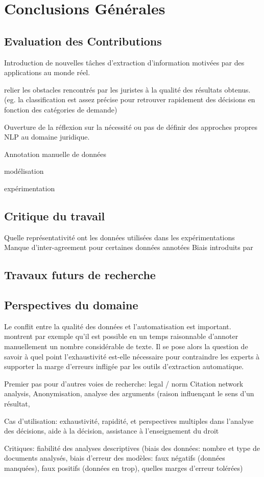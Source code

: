\chapter*{Conclusions Générales}
\label{chap:conclusion}

\section{Evaluation des Contributions}
\label{sec:conclusion:contributions}
Introduction de nouvelles tâches d'extraction d'information motivées par des applications au monde réel.

relier les obstacles rencontrés par les juristes à la qualité des résultats obtenus. (eg. la classification est assez précise pour retrouver rapidement des décisions en fonction des catégories de demande)

Ouverture de la réflexion sur la nécessité ou pas de définir des approches propres NLP au domaine juridique.

Annotation manuelle de données

modélisation

expérimentation


\section{Critique du travail}
\label{sec:conclusion:critique}
Quelle représentativité ont les données utilisées dans les expérimentations
Manque d'inter-agreement pour certaines données annotées
Biais introduits par

\section{Travaux futurs de recherche}
\label{sec:conclusion:extensions}

\section{Perspectives du domaine}
\label{sec:conclusion:perspectives}

Le conflit entre la qualité des données et l'automatisation est important. \cite{Galgani2015lexa} montrent par exemple qu'il est possible en un temps raisonnable d'annoter manuellement un nombre considérable de texte. Il se pose alors la question de savoir à quel point l'exhaustivité est-elle nécessaire pour contraindre les experts à supporter la marge d'erreurs infligée par les outils d'extraction automatique.

Premier pas pour d'autres voies de recherche: legal / norm Citation network analysis, Anonymisation, analyse des arguments (raison influençant le sens d'un résultat, 

Cas d'utilisation: exhaustivité, rapidité, et perspectives multiples dans l'analyse des décisions, aide à la décision, assistance à l'enseignement du droit

Critiques: fiabilité des analyses descriptives (biais des données: nombre et type de documents analysés, biais d'erreur des modèles: faux négatifs (données manquées), faux positifs (données en trop), quelles marges d'erreur tolérées)
